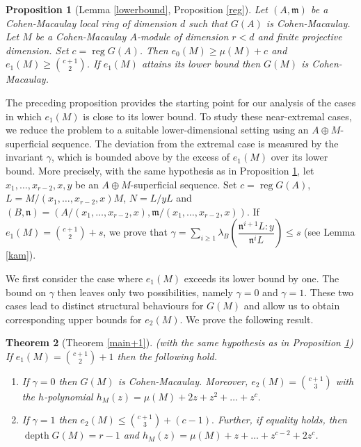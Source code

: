 \documentclass[11pt]{amsart}
\theoremstyle{plain}
\newtheorem{theorem}{Theorem}[section]
\newtheorem{proposition}[theorem]{Proposition}
\newcommand{\m}{\mathfrak{m}}
\newcommand{\n}{\mathfrak{n}}
\newcommand{\depth}{\operatorname{depth}}
\newcommand{\reg}{\operatorname{reg}}
\theoremstyle{plain}
\begin{document}
\begin{proposition}[Lemma \ref{lowerbound}, Proposition \ref{reg}] \label{r1}
    Let $(A,\mathfrak{m})$ be a Cohen-Macaulay local ring of dimension $d$ such that $G(A)$ is Cohen-Macaulay. Let $M$ be a Cohen-Macaulay $A$-module of dimension $r<d$ and finite projective dimension. Set $c=\operatorname{reg} G(A)$. Then $e_0(M)\geq\mu(M)+c$ and $e_1(M)\geq\binom{c+1}{2}$. If $e_1(M)$ attains its lower bound then $G(M)$ is Cohen-Macaulay.
\end{proposition}

The preceding proposition provides the starting point for our analysis of the cases in which $e_1(M)$ is close to its lower bound. To study these near-extremal cases, we reduce the problem to a suitable lower-dimensional setting using an $A\oplus M$-superficial sequence. The deviation from the extremal case is measured by the invariant $\gamma$, which is bounded above by the excess of $e_1(M)$ over its lower bound. More precisely, with the same hypothesis as in Proposition \ref{r1}, let $x_1,\ldots,x_{r-2},x,y$ be an $A\oplus M$-superficial sequence. Set $c=\reg G(A)$, $L=M/(x_1,\ldots,x_{r-2},x)M$, $N=L/yL$ and $(B,\n)=(A/(x_1,\ldots,x_{r-2},x),\m/(x_1,\ldots,x_{r-2},x))$. If $e_1(M)=\binom{c+1}{2}+s$, we prove that
$\displaystyle \gamma=\sum_{i\geq 1} \lambda_B \left(\dfrac{\n^{i+1}L:y}{\n^iL }\right)\leq s$ (see Lemma \ref{kam}).

We first consider the case where $e_1(M)$ exceeds its lower bound by one. The bound on $\gamma$ then leaves only two possibilities, namely $\gamma=0$ and $\gamma=1$. These two cases lead to distinct structural behaviours for $G(M)$ and allow us to obtain corresponding upper bounds for $e_2(M)$. We prove the following result.


\begin{theorem}[Theorem \ref{main+1}] \label{r2}
     (with the same hypothesis as in Proposition \ref{r1}) If $e_1(M)=\binom{c+1}{2}+1$ then the following hold. 
     \begin{enumerate}
         \item If $\gamma=0$ then $G(M)$ is Cohen-Macaulay. Moreover, $e_2(M)=\binom{c+1}{3}$ with the $h$-polynomial $h_M(z) = \mu(M)+2z+z^2+\ldots+ z^{c}.$
         \item  If $\gamma=1$ then $e_2(M)\leq \binom{c+1}{3}+(c-1).$ Further, if equality holds, then $\depth G(M) = r-1$ and $h_M(z)=\mu(M)+z+\ldots+z^{c-2}+2z^{c}$.
     \end{enumerate} 
\end{theorem}
\end{document}
